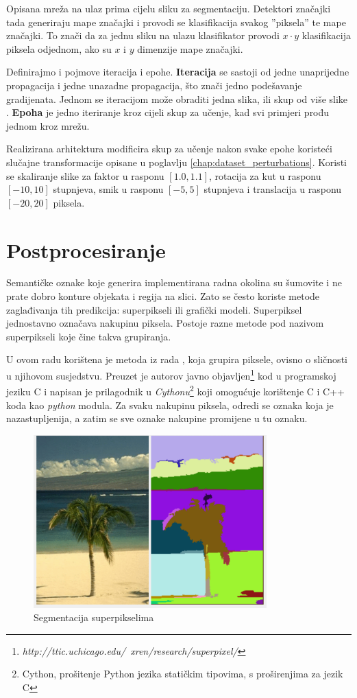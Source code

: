 \documentclass[times, utf8, diplomski, numeric]{fer}
\begin{document}
Opisana mreža na ulaz prima cijelu sliku za segmentaciju. Detektori značajki tada generiraju mape značajki i provodi se klasifikacija svakog ''piksela'' te mape značajki. To znači da za jednu sliku na ulazu klasifikator provodi $x \cdot y$ klasifikacija piksela odjednom, ako su $x$ i $y$ dimenzije mape značajki.

Definirajmo i pojmove iteracija i epohe. \textbf{Iteracija} se sastoji od jedne unaprijedne propagacija i jedne unazadne propagacija, što znači jedno podešavanje gradijenata. Jednom se iteracijom može obraditi jedna slika, ili skup od više slike . \textbf{Epoha} je jedno iteriranje kroz cijeli skup za učenje, kad svi primjeri prođu jednom kroz mrežu.

Realizirana arhitektura modificira skup za učenje nakon svake epohe koristeći slučajne transformacije opisane u poglavlju \ref{chap:dataset_perturbations}. Koristi se skaliranje slike za faktor u rasponu $[1.0, 1.1]$, rotacija za kut u rasponu $[-10, 10]$ stupnjeva, smik u rasponu $[-5, 5]$ stupnjeva i translacija u rasponu $[-20, 20]$ piksela.


\section{Postprocesiranje}

Semantičke oznake koje generira implementirana radna okolina su šumovite i ne prate dobro konture objekata i regija na slici. Zato se često koriste metode zaglađivanja tih predikcija: superpikseli ili grafički modeli. Superpiksel jednostavno označava nakupinu piksela. Postoje razne metode pod nazivom superpikseli koje čine takva grupiranja.

U ovom radu korištena je metoda iz rada \cite{Felzenszwalb04}, koja grupira piksele, ovisno o sličnosti u njihovom susjedstvu. Preuzet je autorov javno objavljen\footnote{\textit{http://ttic.uchicago.edu/~xren/research/superpixel/}} kod u programskoj jeziku C i napisan je prilagodnik u \textit{Cythonu}\footnote{Cython, prošitenje Python jezika statičkim tipovima, s proširenjima za jezik C} koji omogućuje korištenje C i C++ koda kao \textit{python} modula. Za svaku nakupinu piksela, odredi se oznaka koja je nazastupljenija, a zatim se sve oznake nakupine promijene u tu oznaku.

\begin{figure}[tb]
\centering
\includegraphics[width=340px]{imgs/superpixel.png}
\caption{Segmentacija superpikselima}
\end{figure}
\end{document}
